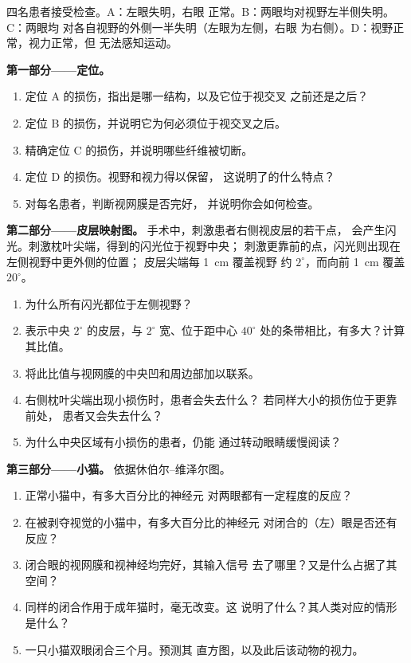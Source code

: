 \begin{problem}
\label{pb:g11:vision-and-brain:1}
四名患者接受检查。A：左眼失明，右眼
正常。B：两眼均对视野左半侧失明。C：两眼均
对各自视野的外侧一半失明（左眼为左侧，右眼
为右侧）。D：视野正常，视力正常，但
无法感知运动。

\medskip
\noindent\textbf{第一部分——定位。}
\begin{enumerate}
  \item 定位 A 的损伤，指出是哪一结构，以及它位于视交叉
        之前还是之后？
  \item 定位 B 的损伤，并说明它为何必须位于视交叉之后。
  \item 精确定位 C 的损伤，并说明哪些纤维被切断。
  \item 定位 D 的损伤。视野和视力得以保留，
        这说明了的什么特点？
  \item 对每名患者，判断视网膜是否完好，
        并说明你会如何检查。
\end{enumerate}

\medskip
\noindent\textbf{第二部分——皮层映射图。}
手术中，刺激患者右侧视皮层的若干点，
会产生闪光。刺激枕叶尖端，得到的闪光位于视野中央；
刺激更靠前的点，闪光则出现在左侧视野中更外侧的位置；
皮层尖端每 \qty{1}{cm} 覆盖视野
约 $2^\circ$，而向前 \qty{1}{cm} 覆盖
$20^\circ$。
\begin{enumerate}[resume]
  \item 为什么所有闪光都位于左侧视野？
  \item 表示中央 $2^\circ$ 的皮层，与
        $2^\circ$ 宽、位于距中心 $40^\circ$ 处的条带相比，有多大？计算其比值。
  \item 将此比值与视网膜的中央凹和周边部加以联系。
  \item 右侧枕叶尖端出现小损伤时，患者会失去什么？
        若同样大小的损伤位于更靠前处，
        患者又会失去什么？
  \item 为什么中央区域有小损伤的患者，仍能
        通过转动眼睛缓慢阅读？
\end{enumerate}

\medskip
\noindent\textbf{第三部分——小猫。}
依据休伯尔–维泽尔图。
\begin{enumerate}[resume]
  \item 正常小猫中，有多大百分比的神经元
        对两眼都有一定程度的反应？
  \item 在被剥夺视觉的小猫中，有多大百分比的神经元
        对闭合的（左）眼是否还有反应？
  \item 闭合眼的视网膜和视神经均完好，其输入信号
        去了哪里？又是什么占据了其空间？
  \item 同样的闭合作用于成年猫时，毫无改变。这
        说明了什么？其人类对应的情形是什么？
  \item 一只小猫双眼闭合三个月。预测其
        直方图，以及此后该动物的视力。
\end{enumerate}


\end{problem}
